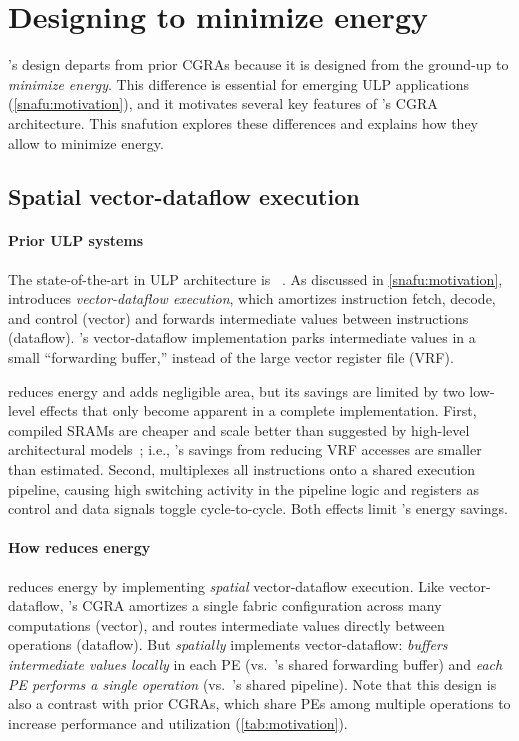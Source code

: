 \section{Designing \snafuframe to minimize energy}
\label{snafu:energy}

\snafuframe's design departs from prior CGRAs because it is designed from the ground-up to \emph{minimize energy}.
This difference is essential for emerging ULP applications (\autoref{snafu:motivation}),
and it motivates several key features of \snafuframe's CGRA architecture.
%
This snafution explores these differences and explains how they allow \snafuframe to minimize energy.

\subsection{Spatial vector-dataflow execution}

\paragraph{Prior ULP systems}
The state-of-the-art in ULP architecture is \manic~\cite{manic}.
%
As discussed in \autoref{snafu:motivation},
\manic introduces \emph{vector-dataflow execution},
which amortizes instruction fetch, decode, and control (vector)
and forwards intermediate values between instructions (dataflow).
\manic's vector-dataflow implementation parks intermediate values in a small ``forwarding buffer,'' instead of the large vector register file (VRF).

\manic reduces energy and adds negligible area,
but its savings are limited by two low-level effects that only become apparent in a complete implementation.
First, compiled SRAMs are cheaper and scale better than
suggested by high-level architectural models~\cite{cacti,destiny};
i.e., \manic's savings from reducing VRF accesses are smaller than estimated.
Second, \manic multiplexes all instructions onto a shared execution pipeline,
causing high switching activity in the pipeline logic and registers as control and data signals toggle cycle-to-cycle.
Both effects limit \manic's energy savings.

\paragraph{How \snafu reduces energy}
%
\snafuframe reduces energy by implementing \emph{spatial} vector-dataflow
execution.
%
Like vector-dataflow,
\snafuframe's CGRA amortizes a single fabric configuration across many computations (vector),
and routes intermediate values directly between operations (dataflow).
%
But \snafuframe \emph{spatially} implements vector-dataflow:
\snafuframe \emph{buffers intermediate values locally} in each PE (vs.\ \manic's shared forwarding buffer)
and \emph{each PE performs a single operation} (vs.\ \manic's shared pipeline).
%
Note that this design is also a contrast with prior CGRAs, which share PEs among
multiple operations to increase performance and utilization (\autoref{tab:motivation}).

